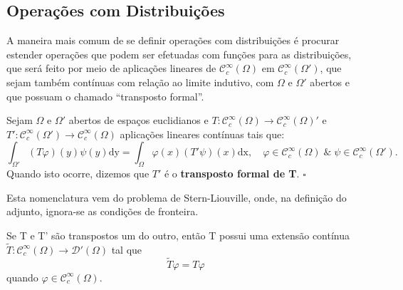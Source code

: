 \documentclass[../distribution_theory_notes.tex]{subfiles}
\begin{document}
\subsection{Operações com Distribuições}
A maneira mais comum de se definir operações com distribuições é procurar estender operações que podem ser efetuadas com funções para as distribuições, que será feito por meio de aplicações lineares de \(\mathcal{C}_{c}^{\infty}(\Omega )\) em \(\mathcal{C}_{c}^{\infty}(\Omega ')\), que sejam também contínuas com relação ao limite indutivo, com \(\Omega \) e \(\Omega '\) abertos e que possuam o chamado ``transposto formal''.
\begin{def*}
	Sejam \(\Omega \) e \(\Omega '\) abertos de espaços euclidianos e \(T:\mathcal{C}_{c}^{\infty}(\Omega )\rightarrow \mathcal{C}_{c}^{\infty}(\Omega )'\) e \(T':\mathcal{C}_{c}^{\infty}(\Omega') \rightarrow \mathcal{C}_{c}^{\infty}(\Omega )\) aplicações lineares contínuas tais que:
	\[
		\int_{\Omega '}^{}(T\varphi )(y)\psi (y) \mathrm{dy} = \int_{\Omega }^{}\varphi (x)(T'\psi )(x) \mathrm{dx},\quad \varphi \in \mathcal{C}_{c}^{\infty}(\Omega )\;\&\; \psi\in \mathcal{C}_{c}^{\infty}(\Omega ').
	\]
	Quando isto ocorre, dizemos que \(T'\) é o \textbf{transposto formal de T}. \(\square\)
\end{def*}
Esta nomenclatura vem do problema de Stern-Liouville, onde, na definição do adjunto, ignora-se as condições de fronteira.
\begin{lemma*}
	Se T e T' são transpostos um do outro, então T possui uma extensão contínua \(\tilde{T}:\mathcal{C}_{c}^{\infty}(\Omega )\rightarrow \mathcal{D}'(\Omega )\) tal que
	\[
		\tilde{T}\varphi = T\varphi
	\]
	quando \(\varphi \in \mathcal{C}_{c}^{\infty}(\Omega )\).
\end{lemma*}
\end{document}
